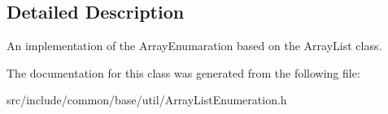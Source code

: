 \subsection{Detailed Description}
An implementation of the Array\-Enumaration based on the Array\-List class. 



The documentation for this class was generated from the following file:\begin{CompactItemize}
\item 
src/include/common/base/util/Array\-List\-Enumeration.h\end{CompactItemize}
